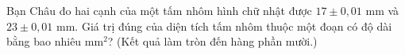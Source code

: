 \begin{ex}
Bạn Châu đo hai cạnh của một tấm nhôm hình chữ nhật được $17\pm0{,}01$ mm và $23\pm0{,}01$ mm. Giá trị đúng của diện tích tấm nhôm thuộc một đoạn có độ dài bằng bao nhiêu mm$^2$? (Kết quả làm tròn đến hàng phần mười.)
\end{ex}
